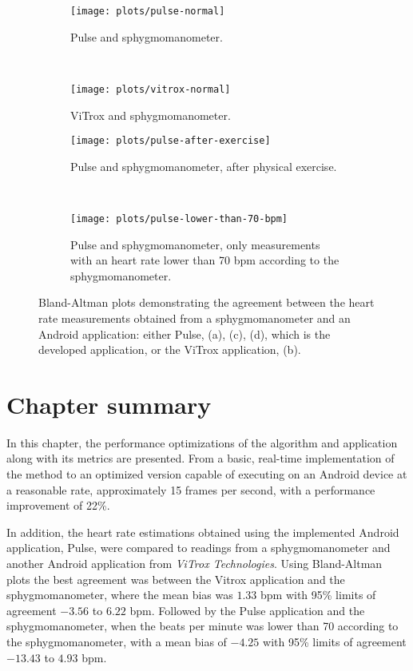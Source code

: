 \begin{figure}[p]
  \begin{subfigure}{0.5\textwidth}
    \texttt{[image: plots/pulse-normal]}
    \caption{Pulse and sphygmomanometer.}
    \label{fig:plots:heart:pulse:normal}
  \end{subfigure}
  ~
  \begin{subfigure}{0.5\textwidth}
    \texttt{[image: plots/vitrox-normal]}
    \caption{ViTrox and sphygmomanometer.}
    \label{fig:plots:heart:vitrox:normal}
  \end{subfigure}

  \begin{subfigure}{0.5\textwidth}
    \texttt{[image: plots/pulse-after-exercise]}
    \caption{Pulse and sphygmomanometer, after physical exercise.}
    \label{fig:plots:heart:pulse:exercise}
  \end{subfigure}
  ~
  \begin{subfigure}{0.5\textwidth}
    \texttt{[image: plots/pulse-lower-than-70-bpm]}
    \caption{
      Pulse and sphygmomanometer, only measurements with an heart rate lower
      than 70 bpm according to the sphygmomanometer.
    }
    \label{fig:plots:heart:pulse:low}
  \end{subfigure}

  \caption{
    Bland-Altman plots demonstrating the agreement between the heart rate
    measurements obtained from a sphygmomanometer and an Android application:
    either Pulse, (a), (c), (d), which is the developed application,
    or the ViTrox application, (b).
  }
  \label{fig:plots:heart}
\end{figure}

\section{Chapter summary}

In this chapter, the performance optimizations of the algorithm and application
along with its metrics are presented. From a basic, real-time
implementation of the \evm{} method to an optimized version capable of
executing on an Android device at a reasonable rate, approximately
15 frames per second, with a performance improvement of 22\%.

In addition, the heart rate estimations obtained using the
implemented Android application, Pulse, were compared to readings
from a sphygmomanometer and another Android application from
\emph{ViTrox Technologies}. Using Bland-Altman plots the best agreement
was between the Vitrox application and the sphygmomanometer, where the mean
bias was $1.33$ bpm with 95\% limits of agreement $-3.56$ to $6.22$ bpm.
Followed by the Pulse application and the sphygmomanometer, when the
beats per minute was lower than 70 according to the sphygmomanometer, with a
mean bias of $-4.25$ with 95\% limits of agreement $-13.43$ to $4.93$ bpm.
